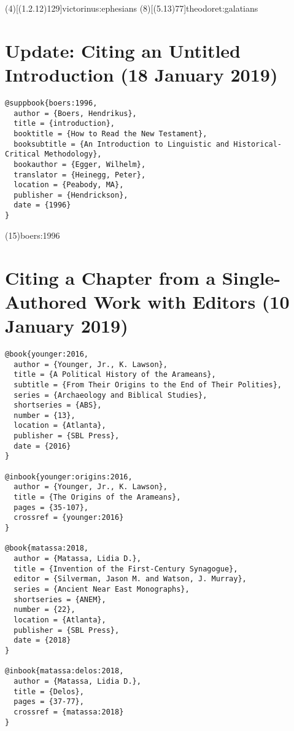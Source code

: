 \documentclass[a4paper]{article}
\begin{document}
\examplecite(4)[(1.2.12)129]{victorinus:ephesians}
\examplecite(8)[(5.13)77]{theodoret:galatians}
\nocite{ACCS}
\exampleabbreviations
\examplebibliography
{}

\section{Update: Citing an Untitled Introduction (18 January 2019)}

\begin{verbatim}
@suppbook{boers:1996,
  author = {Boers, Hendrikus},
  title = {introduction},
  booktitle = {How to Read the New Testament},
  booksubtitle = {An Introduction to Linguistic and Historical-Critical Methodology},
  bookauthor = {Egger, Wilhelm},
  translator = {Heinegg, Peter},
  location = {Peabody, MA},
  publisher = {Hendrickson},
  date = {1996}
}
\end{verbatim}

\examplecite(15){boers:1996}
\examplebibliography
{}

\section{Citing a Chapter from a Single-Authored Work with Editors (10 January 2019)}

\begin{verbatim}
@book{younger:2016,
  author = {Younger, Jr., K. Lawson},
  title = {A Political History of the Arameans},
  subtitle = {From Their Origins to the End of Their Polities},
  series = {Archaeology and Biblical Studies},
  shortseries = {ABS},
  number = {13},
  location = {Atlanta},
  publisher = {SBL Press},
  date = {2016}
}

@inbook{younger:origins:2016,
  author = {Younger, Jr., K. Lawson},
  title = {The Origins of the Arameans},
  pages = {35-107},
  crossref = {younger:2016}
}

@book{matassa:2018,
  author = {Matassa, Lidia D.},
  title = {Invention of the First-Century Synagogue},
  editor = {Silverman, Jason M. and Watson, J. Murray},
  series = {Ancient Near East Monographs},
  shortseries = {ANEM},
  number = {22},
  location = {Atlanta},
  publisher = {SBL Press},
  date = {2018}
}

@inbook{matassa:delos:2018,
  author = {Matassa, Lidia D.},
  title = {Delos},
  pages = {37-77},
  crossref = {matassa:2018}
}
\end{verbatim}
\end{document}
